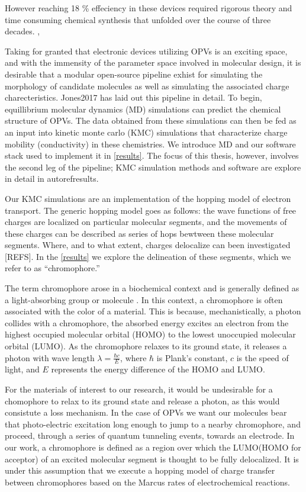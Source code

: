However reaching 18 \% effeciency in these devices required rigorous theory and 
time consuming chemical synthesis
that unfolded over the course of three decades.  
,

Taking for granted that electronic devices utilizing OPVs is an exciting
space, and with the immensity of the parameter space involved in molecular design, it is desirable that a modular
open-source pipeline exhist for simulating the morphology of candidate molecules as well as simulating the 
associated charge charecteristics. Jones2017 has laid out this
pipeline in detail. To begin, equillibrium molecular dynamics (MD) simulations can predict the chemical
structure of OPVs. The data obtained from these simulations can then be fed as an input into kinetic monte
carlo (KMC) simulations that characterize charge mobility (conductivity) in these chemistries. We introduce MD
and our software stack used to implement it in \autoref{results}. The focus of this thesis, however, involves
the second leg of the pipeline; KMC simulation methods and software are explore in detail in autoref{results}.

Our KMC simulations are an implementation of the hopping model of electron transport.
The generic hopping model goes as follows: the wave functions of
free charges are localized on particular molecular segments, and the movements of these charges can be described as series
of hops bewtween these molecular segments. Where, and to what extent, charges delocalize can been investigated
[REFS]. In the \autoref{results} we explore the delineation of these segments, which we refer to as
``chromophore.'' 

The term chromophore arose in a biochemical context and is generally defined
as a light-absorbing group or molecule \cite{biochemistry}.
In this context, a chromophore is often associated with the color of a material.
This is because, mechanistically, a photon collides with a chromophore, the absorbed energy
excites an electron from the highest occupied molecular orbital (HOMO) to the
lowest unoccupied molecular orbital (LUMO). As the chromophore relaxes to its
ground state, it releases a photon with wave length $\lambda = \frac{\hbar c}{E}$,
where $\hbar$ is Plank's constant, $c$ is the speed of light, and $E$ represents the
energy difference of the HOMO and LUMO. 

For the materials of interest to our research, it would be undesirable for a chomophore to relax to its ground
state and release a photon, as this would consistute a loss mechanism. In the case of
OPVs we want our molecules bear that photo-electric
excitation long enough to jump to a nearby chromophore, and proceed, through a
series of quantum tunneling events, towards an electrode. 
In our work, a chromophore is defined as a region over which the
LUMO(HOMO for acceptor) of an excited molecular segment is thought to be fully delocalized. 
It is under this assumption that we execute a hopping model of charge transfer between
chromophores based on the Marcus rates of electrochemical reactions.  

